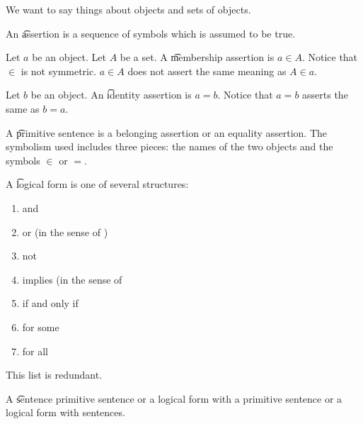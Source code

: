 

We want to say things about objects and sets of objects.


An \t{assertion} is a sequence of symbols which is assumed to be true.

Let $a$ be an object.
Let $A$ be a set.
A \t{membership assertion} is $a \in A$.
Notice that $\in$ is not symmetric.
$a \in A$ does not assert the same meaning as $A \in a$.

Let $b$ be an object.
An \t{identity assertion}
is $a = b$.
Notice that $a = b$
asserts the same as $b = a$.

A \t{primitive sentence} is a belonging assertion or an equality assertion.
The symbolism used includes three pieces: the names of the two objects and the symbols $\in$ or $=$.

A \t{logical form} is one of several structures:

\begin{enumerate}

  \item

    and

  \item

    or (in the sense of )

  \item

    not

  \item

    implies (in the sense of 

  \item

    if and only if

  \item

    for some

  \item

    for all
\end{enumerate}

This list is redundant.

A \t{sentence} primitive sentence or a logical form with a primitive sentence or a logical form with sentences.
